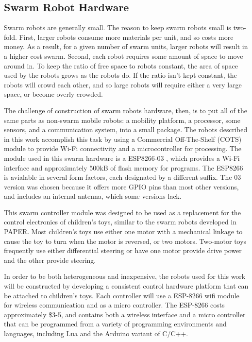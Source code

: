 \documentclass[]{article}
\begin{document}
\subsection{Swarm Robot Hardware}

Swarm robots are generally small. 
The reason to keep swarm robots small is two-fold. 
First, larger robots consume more materials per unit, and so costs more money.
As a result, for a given number of swarm units, larger robots will result in a higher cost swarm. 
Second, each robot requires some amount of space to move around in. 
To keep the ratio of free space to robots constant, the area of space used by the robots grows as the robots do. 
If the ratio isn't kept constant, the robots will crowd each other, and so large robots will require either a very large space, or become overly crowded.

The challenge of construction of swarm robots hardware, then, is to put all of the same parts as non-swarm mobile robots: a mobility platform, a processor, some sensors, and a communication system, into a small package.  
The robots described in this work accomplish this task by using a Commercial Off-The-Shelf (COTS) module to provide Wi-Fi connectivity and a microcontroller for processing. 
The module used in this swarm hardware is a ESP8266-03  , which provides a Wi-Fi interface and approximately 500kB of flash memory for programs. 
The ESP8266 is avialable in several form factors, each designated by a different suffix. 
The 03 version was chosen because it offers more GPIO pins than most other versions, and includes an internal antenna, which some versions lack. 

This swarm controller module was designed to be used as a replacement for the control electronics of children's toys, similar to the  swarm robots developed in PAPER. 
Most children's toys use either one motor with a mechanical linkage to cause the toy to turn when the motor is reversed, or two motors.
Two-motor toys frequently use either differential steering or have one motor provide drive power and the other provide steering. 

In order to be both heterogeneous and inexpensive, the robots used for this work will be constructed by developing a consistent control hardware platform that can be attached to children's toys. 
Each controller will use a ESP-8266 wifi module for wireless communication and as a micro controller. 
The ESP-8266 costs approximately \$3-5, and contains both a wireless interface and a micro controller that can be programmed from a variety of programming environments and languages, including Lua and the Arduino variant of C/C++. 
\end{document}
